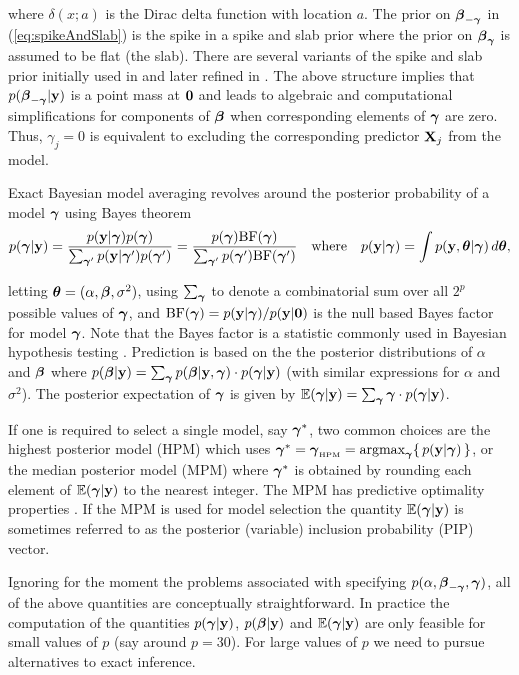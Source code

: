 \noindent where $\delta(x;a)$ is the Dirac delta function with location $a$.  
The prior on ${\boldsymbol \beta}_{-{\boldsymbol \gamma}}$ in (\ref{eq:spikeAndSlab}) is the spike 
in a spike and slab prior where the prior on ${\boldsymbol \beta}_{{\boldsymbol \gamma}}$ is assumed to be flat (the slab). There are
several variants of the spike and slab prior initially used in
\cite{Mitchell1988}
and later refined in
\cite{George1993}. 
The above structure implies 
that $p({\boldsymbol \beta}_{-{\boldsymbol \gamma}}|{\bf y})$ is a point mass at ${\bf 0}$
and leads to
algebraic and computational simplifications for components of ${\boldsymbol \beta}$ when corresponding elements of ${\boldsymbol \gamma}$ are zero.
Thus, $\gamma_j=0$ is equivalent to excluding the corresponding predictor ${\bf X}_j$ from the model.


Exact Bayesian model averaging revolves around the posterior
probability of a model ${\boldsymbol \gamma}$ using Bayes theorem
$$
\displaystyle p({\boldsymbol \gamma}|{\bf y}) = \frac{p({\bf y}|{\boldsymbol \gamma})p({\boldsymbol \gamma})}{\sum_{{\boldsymbol \gamma}'} p({\bf y}|{\boldsymbol \gamma}')p({\boldsymbol \gamma}')} = \frac{p({\boldsymbol \gamma})\mbox{BF}({\boldsymbol \gamma})}{\sum_{{\boldsymbol \gamma}'} p({\boldsymbol \gamma}')\mbox{BF}({\boldsymbol \gamma}')}
\quad \mbox{where} \quad 
p({\bf y}|{\boldsymbol \gamma}) = \int p({\bf y},{\boldsymbol \theta}|{\boldsymbol \gamma}) \, d{\boldsymbol \theta},
$$

\noindent letting ${\boldsymbol \theta} = (\alpha,{\boldsymbol \beta},\sigma^2)$, using $\sum_{{\boldsymbol \gamma}}$ to denote a combinatorial sum over all
$2^p$ possible values of ${\boldsymbol \gamma}$, and $\mbox{BF}({\boldsymbol \gamma}) = p({\bf y}|{\boldsymbol \gamma})/p({\bf y}|{\bf 0})$
is the null based Bayes factor for model ${\boldsymbol \gamma}$.
Note that the Bayes factor is a statistic commonly used in Bayesian hypothesis testing 
\citep{Kass1995,OrmerodEtal2017}.
Prediction is based on the 
the posterior distributions of $\alpha$ and ${\boldsymbol \beta}$ where
$p({\boldsymbol \beta}|{\bf y}) = \sum_{{\boldsymbol \gamma}} p({\boldsymbol \beta}|{\bf y},{\boldsymbol \gamma}) \cdot p({\boldsymbol \gamma}|{\bf y})$
(with similar expressions for $\alpha$ and $\sigma^2$).
The 
posterior expectation of ${\boldsymbol \gamma}$ is given by
${\mathbb E}({\boldsymbol \gamma}|{\bf y}) = \sum_{{\boldsymbol \gamma}} {\boldsymbol \gamma} \cdot p({\boldsymbol \gamma}|{\bf y})$.

If one is required to select a single model, say ${\boldsymbol \gamma}^*$, two common choices are the 
highest posterior model (HPM) which uses $\vgamma^* = \vgamma_{\mbox{\tiny HPM}} = \argmax_\vgamma \{ \, p(\vy|\vgamma) \, \}$, or the
median posterior model (MPM) where ${\boldsymbol \gamma}^*$ is obtained by
rounding each element of ${\mathbb E}({\boldsymbol \gamma}|{\bf y})$ to the nearest integer.
The MPM has predictive optimality properties \citep{Barbieri2004}.
If the MPM is used for model selection
the quantity ${\mathbb E}({\boldsymbol \gamma}|{\bf y})$ is sometimes referred to as the
posterior (variable) inclusion probability (PIP) vector.

Ignoring for the moment the problems associated with specifying
$p(\alpha,{\boldsymbol \beta}_{-{\boldsymbol \gamma}},{\boldsymbol \gamma})$, all of the above quantities are conceptually
straightforward. In practice the computation of the quantities $p({\boldsymbol \gamma}|{\bf y})$, $p({\boldsymbol \beta}|{\bf y})$ and 
${\mathbb E}({\boldsymbol \gamma}|{\bf y})$ are only feasible for small values of $p$ (say around $p=30$). For large values of $p$ we need to pursue
alternatives to exact inference.



